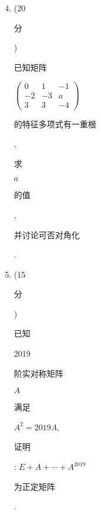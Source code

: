 \documentclass[10pt]{article}
\begin{document}
\begin{enumerate}
  \setcounter{enumi}{3}
  \item (20 \begin{CJK}{UTF8}{mj}分\end{CJK}) \begin{CJK}{UTF8}{mj}已知矩阵\end{CJK} $\left(\begin{array}{ccc}0 & 1 & -1 \\ -2 & -3 & a \\ 3 & 3 & -4\end{array}\right)$ \begin{CJK}{UTF8}{mj}的特征多项式有一重根\end{CJK}, \begin{CJK}{UTF8}{mj}求\end{CJK} $a$ \begin{CJK}{UTF8}{mj}的值\end{CJK}, \begin{CJK}{UTF8}{mj}并讨论可否对角化\end{CJK}.

  \item (15 \begin{CJK}{UTF8}{mj}分\end{CJK}) \begin{CJK}{UTF8}{mj}已知\end{CJK} 2019 \begin{CJK}{UTF8}{mj}阶实对称矩阵\end{CJK} $A$ \begin{CJK}{UTF8}{mj}满足\end{CJK} $A^{2}=2019 A$, \begin{CJK}{UTF8}{mj}证明\end{CJK}: $E+A+\cdots+A^{2019}$ \begin{CJK}{UTF8}{mj}为正定矩阵\end{CJK}.


\end{enumerate}
\end{document}
